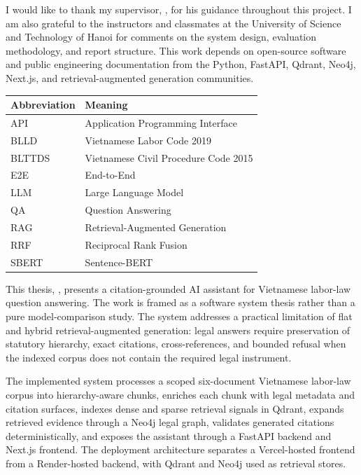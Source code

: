 \documentclass[11pt]{extarticle}
\begin{document}
\vspace{1.5cm}
\thesissupervisor

I would like to thank my supervisor, \thesissupervisor, for his guidance throughout this project. I am also grateful to the instructors and classmates at the University of Science and Technology of Hanoi for comments on the system design, evaluation methodology, and report structure. This work depends on open-source software and public engineering documentation from the Python, FastAPI, Qdrant, Neo4j, Next.js, and retrieval-augmented generation communities.

\clearpage
\tableofcontents

\begin{table}[H]
  \centering
  \begin{tabular}{@{}ll@{}}
    \toprule
    Abbreviation & Meaning \\
    \midrule
    API & Application Programming Interface \\
    BLLD & Vietnamese Labor Code 2019 \\
    BLTTDS & Vietnamese Civil Procedure Code 2015 \\
    E2E & End-to-End \\
    LLM & Large Language Model \\
    QA & Question Answering \\
    RAG & Retrieval-Augmented Generation \\
    RRF & Reciprocal Rank Fusion \\
    SBERT & Sentence-BERT \\
    \bottomrule
  \end{tabular}
\end{table}

\clearpage
\listoftables

\clearpage
\listoffigures

This thesis, \textit{\thesistitle}, presents a citation-grounded AI assistant for Vietnamese labor-law question answering. The work is framed as a software system thesis rather than a pure model-comparison study. The system addresses a practical limitation of flat and hybrid retrieval-augmented generation: legal answers require preservation of statutory hierarchy, exact citations, cross-references, and bounded refusal when the indexed corpus does not contain the required legal instrument.

The implemented system processes a scoped six-document Vietnamese labor-law corpus into hierarchy-aware chunks, enriches each chunk with legal metadata and citation surfaces, indexes dense and sparse retrieval signals in Qdrant, expands retrieved evidence through a Neo4j legal graph, validates generated citations deterministically, and exposes the assistant through a FastAPI backend and Next.js frontend. The deployment architecture separates a Vercel-hosted frontend from a Render-hosted backend, with Qdrant and Neo4j used as retrieval stores.
\end{document}
